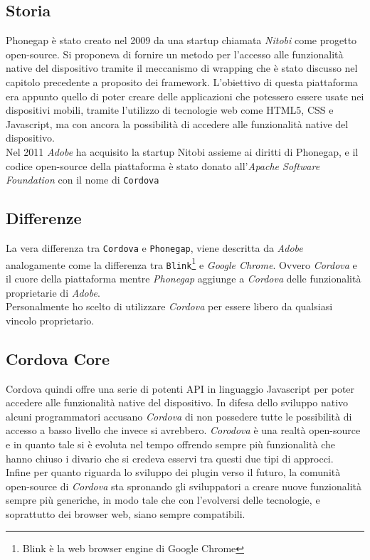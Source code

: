\subsection{Storia}
Phonegap è stato creato nel 2009 da una startup chiamata \emph{Nitobi} come progetto open-source. Si proponeva di fornire un metodo per l'accesso alle funzionalità native del dispositivo tramite il meccanismo di wrapping che è stato discusso nel capitolo precedente a proposito dei framework. L'obiettivo di questa piattaforma era appunto quello di poter creare delle applicazioni che potessero essere usate nei dispositivi mobili, tramite l'utilizzo di tecnologie web come HTML5, CSS e Javascript, ma con ancora la possibilità di accedere alle funzionalità native del dispositivo.\\
Nel 2011 \emph{Adobe} ha acquisito la startup Nitobi assieme ai diritti di Phonegap, e il codice open-source della piattaforma è stato donato all'\emph{Apache Software Foundation} con il nome di \texttt{Cordova}
\subsection{Differenze}
La vera differenza tra \texttt{Cordova} e \texttt{Phonegap}, viene descritta da \emph{Adobe} analogamente come la differenza tra \texttt{Blink}\footnote{Blink è la web browser engine di Google Chrome\cite{wiki:blink}} e \emph{Google Chrome}. Ovvero \emph{Cordova} e il cuore della piattaforma mentre \emph{Phonegap} aggiunge a \emph{Cordova} delle funzionalità proprietarie di \emph{Adobe}.\\
Personalmente ho scelto di utilizzare \emph{Cordova} per essere libero da qualsiasi vincolo proprietario.
\subsection{Cordova Core}
Cordova quindi offre una serie di potenti API in linguaggio Javascript per poter accedere alle funzionalità native del dispositivo. In difesa dello sviluppo nativo alcuni programmatori accusano \emph{Cordova} di non possedere tutte le possibilità di accesso a basso livello che invece si avrebbero. \emph{Corodova} è una realtà open-source e in quanto tale si è evoluta nel tempo offrendo sempre più funzionalità che hanno chiuso i divario che si credeva esservi tra questi due tipi di approcci.\\
Infine per quanto riguarda lo sviluppo dei plugin verso il futuro, la comunità open-source di \emph{Cordova} sta spronando gli sviluppatori a creare nuove funzionalità sempre più generiche, in modo tale che con l'evolversi delle tecnologie, e soprattutto dei browser web, siano sempre compatibili.

